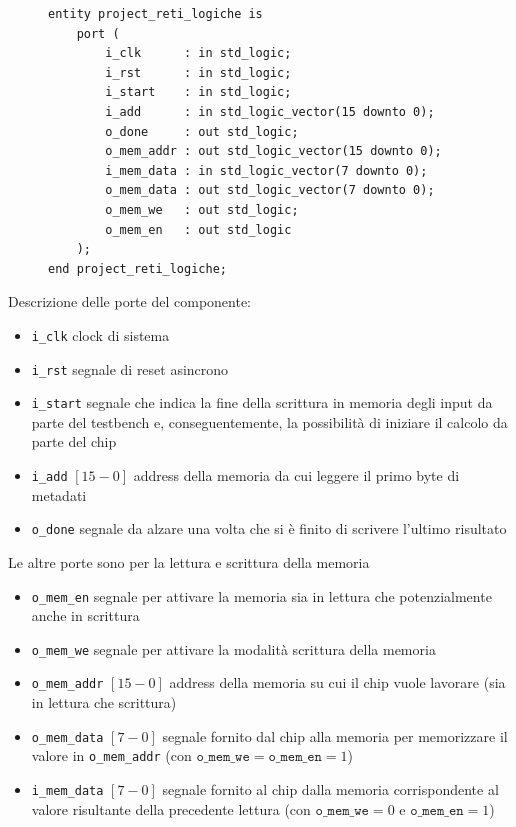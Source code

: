 \documentclass{article}
\begin{document}
\begin{figure}[h!]
    \centering
    \begin{lstlisting}[caption=In \texttt{VHDL} l'entità componente viene definita in questo modo, label=lst:entity_vhdl]
entity project_reti_logiche is
    port (
        i_clk      : in std_logic;
        i_rst      : in std_logic;
        i_start    : in std_logic;
        i_add      : in std_logic_vector(15 downto 0);
        o_done     : out std_logic;
        o_mem_addr : out std_logic_vector(15 downto 0);
        i_mem_data : in std_logic_vector(7 downto 0);
        o_mem_data : out std_logic_vector(7 downto 0);
        o_mem_we   : out std_logic;
        o_mem_en   : out std_logic
    );
end project_reti_logiche;
    \end{lstlisting}
\end{figure}

\noindent Descrizione delle porte del componente:

\begin{itemize}
    \item \texttt{i\_clk} clock di sistema
    \item \texttt{i\_rst} segnale di reset asincrono
    \item \texttt{i\_start} segnale che indica la fine della scrittura in memoria degli input da parte del testbench e, conseguentemente, la possibilità di iniziare il calcolo da parte del chip
    \item \texttt{i\_add} $[15-0]$ address della memoria da cui leggere il primo byte di metadati
    \item \texttt{o\_done} segnale da alzare una volta che si è finito di scrivere l'ultimo risultato
\end{itemize}

Le altre porte sono per la lettura e scrittura della memoria

\begin{itemize}
    \item \texttt{o\_mem\_en} segnale per attivare la memoria sia in lettura che potenzialmente anche in scrittura
    \item \texttt{o\_mem\_we} segnale per attivare la modalità scrittura della memoria
    \item \texttt{o\_mem\_addr} $[15-0]$ address della memoria su cui il chip vuole lavorare (sia in lettura che scrittura)
    \item \texttt{o\_mem\_data} $[7-0]$ segnale fornito dal chip alla memoria per memorizzare il valore in \texttt{o\_mem\_addr} (con $\texttt{o\_mem\_we} = \texttt{o\_mem\_en} = 1$)
    \item \texttt{i\_mem\_data} $[7-0]$ segnale fornito al chip dalla memoria corrispondente al valore risultante della precedente lettura (con $\texttt{o\_mem\_we} = 0$ e $\texttt{o\_mem\_en} = 1$)
\end{itemize}
\end{document}

